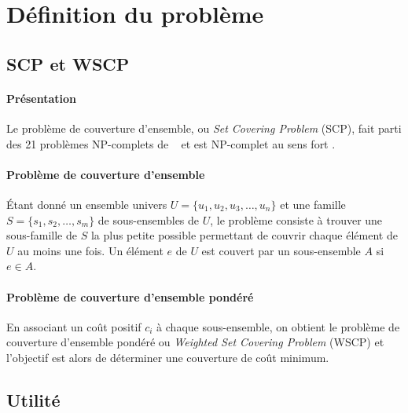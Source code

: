 \documentclass[12pt,letterpaper,twoside]{article}
\begin{document}
	\maketitle{}
	\tableofcontents{}
	\newpage{}
	\section{Définition du problème}
		\subsection{SCP et WSCP}
			\paragraph*{Présentation\\}
				Le problème de couverture d'ensemble, ou \emph{Set Covering Problem} (SCP),
				fait parti des 21 problèmes NP-complets de \citeauthor{Karp1972}~\cite{Karp1972}
				et est NP-complet au sens fort \cite{garey2002computers}.
			\paragraph*{Problème de couverture d'ensemble\\}
				Étant donné un ensemble univers \(U = \{u_1, u_2, u_3, \dots, u_n\}\) et une famille \(S = \{s_1, s_2, \dots, s_m\}\) de sous-ensembles de \(U\),
				le problème consiste à trouver une sous-famille de \(S\) la plus petite possible permettant de couvrir chaque élément de \(U\)
				au moins une fois. Un élément \(e\) de \(U\) est couvert par un sous-ensemble \(A\) si \(e \in A\).
			\paragraph*{Problème de couverture d'ensemble pondéré\\}
				En associant un coût positif \(c_i\) à chaque sous-ensemble, on obtient le problème de couverture d'ensemble pondéré ou \emph{Weighted Set Covering Problem} (WSCP) et	l'objectif est alors de déterminer une couverture de coût minimum.~\cite{Vazirani2003}
		\subsection{Utilité}
\end{document}
